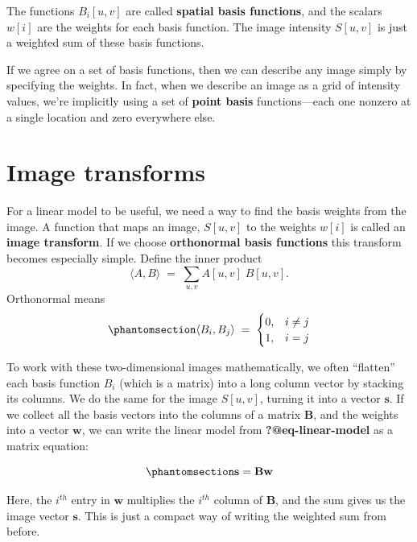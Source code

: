 \documentclass[
  letterpaper,
]{book}
\begin{document}
The functions \(B_i[u,v]\) are called \textbf{spatial basis functions},
and the scalars \(w[i]\) are the weights for each basis function. The
image intensity \(S[u,v]\) is just a weighted sum of these basis
functions.

If we agree on a set of basis functions, then we can describe any image
simply by specifying the weights. In fact, when we describe an image as
a grid of intensity values, we're implicitly using a set of
\textbf{point basis} functions---each one nonzero at a single location
and zero everywhere else.

\section{Image transforms}\label{sec-ls-orthogonal-transforms}

For a linear model to be useful, we need a way to find the basis weights
from the image. A function that maps an image, \(S[u,v]\) to the weights
\(w[i]\) is called an \textbf{image transform}. If we choose
\textbf{orthonormal basis functions} this transform becomes especially
simple. Define the inner product \[
\langle A, B \rangle \;=\; \sum_{u,v} A[u,v]\;B[u,v].
\] Orthonormal means
\begin{equation}\phantomsection\label{eq-spatial-orthonormal}{
\langle B_i, B_j \rangle \;=\; \begin{cases}
0, & i \ne j \\
1, & i=j
\end{cases}
}\end{equation}

To work with these two-dimensional images mathematically, we often
``flatten'' each basis function \(B_i\) (which is a matrix) into a long
column vector by stacking its columns. We do the same for the image
\(S[u,v]\), turning it into a vector \(\mathbf{s}\). If we collect all
the basis vectors into the columns of a matrix \(\mathbf{B}\), and the
weights into a vector \(\mathbf{w}\), we can write the linear model from
\textbf{?@eq-linear-model} as a matrix equation:

\begin{equation}\phantomsection\label{eq-linear-model-matrix}{
\mathbf{s} = \mathbf{B w}
}\end{equation}

Here, the \(i^{th}\) entry in \(\mathbf{w}\) multiplies the \(i^{th}\)
column of \(\mathbf{B}\), and the sum gives us the image vector
\(\mathbf{s}\). This is just a compact way of writing the weighted sum
from before.
\end{document}
